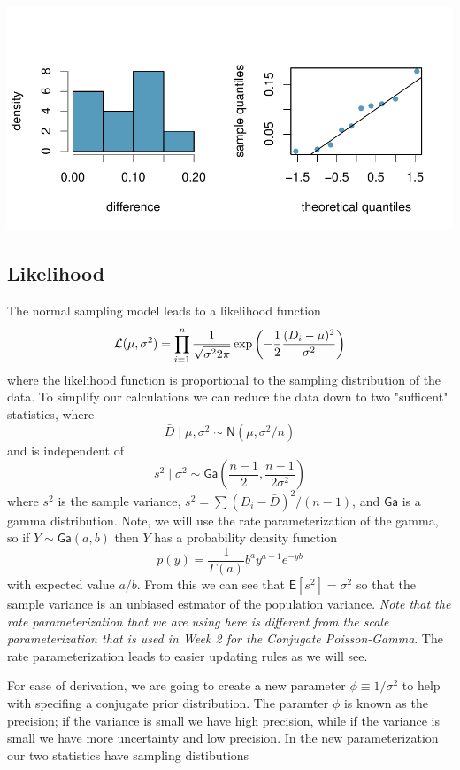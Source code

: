 \documentclass[11pt]{article}
\def\No{\textsf{N}}
\def\Ga{\textsf{Ga}}
\newcommand{\E}{\textsf{E}}
\begin{document}
\includegraphics{4-3-2-pair-notes-hist}

\subsection*{Likelihood}
The normal sampling model leads to a likelihood function 
$$
{\cal{L}}(\mu, \sigma^2) = \prod_{i = 1}^{n} \frac{1}{\sqrt{\sigma^2 2 \pi}} \exp{\left( - \frac{1}{2}\frac{(D_i - \mu)^2}{\sigma^2} \right)} 
$$
where the likelihood function is proportional to the sampling distribution of the data.
To simplify our calculations we can reduce the data down to two "sufficent" statistics, where
$$ \bar{D} \mid \mu, \sigma^2 \sim \No(\mu,  \sigma^2/n)$$
and is independent of 
$$ 
s^2 \mid \sigma^2 \sim  \Ga\left(\frac{n - 1}{2},  \frac{n-1}{2 \sigma^2}\right)
$$
where $s^2$ is the sample variance, $s^2 = \sum(D_i - \bar{D})^2/(n-1)$, and $\Ga$ is a gamma distribution.  Note, we will use the rate parameterization of the gamma, so if $Y \sim \Ga(a, b)$ then $Y$ has a probability density function 
$$
p(y) = \frac{1}{\Gamma(a)} b^a y^{a - 1} e^{- y b} 
$$
with expected value $a/b$.  From this we can see that $\E[s^2] = \sigma^2$ so that the sample variance is an unbiased estmator of the population variance. {\it Note that the rate parameterization that we are using here is different from the scale parameterization that is used in Week 2 for the Conjugate Poisson-Gamma}.  The rate parameterization leads to easier updating rules as we will see.   


For ease of derivation, we are going to create a new parameter $\phi \equiv 1/\sigma^2$ to help with specifing a conjugate prior distribution.  The paramter $\phi$ is known as the precision;  if the variance is small we have high precision, while if the variance is small we have more uncertainty  and low precision.  In the new parameterization our two statistics have sampling distibutions
\end{document}
